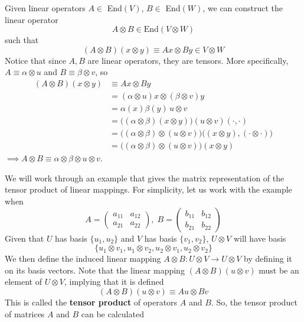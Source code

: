   \begin{definition}
  Given linear operators $A \in $ End$(V)$, $B \in $ End$(W)$, we can construct the linear operator 
  \[A \otimes B \in \text{End}(V \otimes W)\] 
  such that 
  \[(A \otimes B) (x \otimes y) \equiv A x \otimes B y \in V \otimes W\]
  Notice that since $A, B$ are linear operators, they are tensors. More specifically, $A \equiv \alpha \otimes u$ and $B \equiv \beta \otimes v$, so
  \begin{align*}
      (A \otimes B) (x \otimes y) & \equiv A x \otimes B y \\
      & = (\alpha \otimes u) x \otimes (\beta \otimes v) y \\
      & = \alpha (x) \beta (y) \, u \otimes v \\
      & = \big((\alpha \otimes \beta)(x \otimes y)\big) (u \otimes v)(\cdot, \cdot) \\
      & = \big((\alpha \otimes \beta) \otimes (u \otimes v)\big) \big((x \otimes y), (\cdot \otimes \cdot)\big) \\
      & = \big((\alpha \otimes \beta) \otimes (u \otimes v)\big)(x \otimes y) 
  \end{align*}
  $\implies A \otimes B \equiv \alpha \otimes \beta \otimes u \otimes v$. 
  \end{definition}
  We will work through an example that gives the matrix representation of the tensor product of linear mappings. For simplicity, let us work with the example when 
  \[A = \begin{pmatrix}
  a_{11} & a_{12} \\ a_{21} & a_{22}
  \end{pmatrix}, \; B = \begin{pmatrix}
  b_{11} & b_{12} \\ b_{21} & b_{22}
  \end{pmatrix}\]
  Given that $U$ has basis $\{u_1, u_2\}$ and $V$ has basis $\{v_1, v_2\}$, $U \otimes V$ will have basis 
  \[\{u_1 \otimes v_1, u_1 \otimes v_2, u_2 \otimes v_1, u_2 \otimes v_2\}\]
  We then define the induced linear mapping $A\otimes B: U \otimes V \longrightarrow U \otimes V$ by defining it on its basis vectors. Note that the linear mapping $(A \otimes B)(u\otimes v)$ must be an element of $U \otimes V$, implying that it is defined
  \[(A \otimes B)(u\otimes v) \equiv Au \otimes Bv\]
  This is called the \textbf{tensor product} of operators $A$ and $B$.
  So, the tensor product of matrices $A$ and $B$ can be calculated
